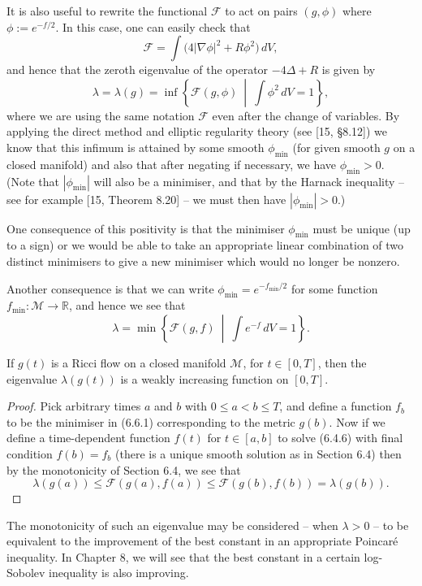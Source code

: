 It is also useful to rewrite the functional $\mathcal{F}$ to act on pairs $(g,\phi)$ where
$\phi := e^{-f/2}$. In this case, one can easily check that
\[
\mathcal{F} = \int \bigl(4|\nabla\phi|^2 + R\phi^2\bigr)\,dV,
\]
and hence that the zeroth eigenvalue of the operator $-4\Delta + R$ is given by
\[
\lambda = \lambda(g) = \inf\left\{\mathcal{F}(g,\phi)\ \middle|\ \int \phi^2\,dV = 1\right\},
\]
where we are using the same notation $\mathcal{F}$ even after the change of variables.
By applying the direct method and elliptic regularity theory (see [15, §8.12])
we know that this infimum is attained by some smooth $\phi_{\min}$ (for given
smooth $g$ on a closed manifold) and also that after negating if necessary, we
have $\phi_{\min} > 0$. (Note that $|\phi_{\min}|$ will also be a minimiser, and that by the
Harnack inequality -- see for example [15, Theorem 8.20] -- we must then
have $|\phi_{\min}| > 0$.)

One consequence of this positivity is that the minimiser $\phi_{\min}$ must be unique
(up to a sign) or we would be able to take an appropriate linear combination
of two distinct minimisers to give a new minimiser which would no longer
be nonzero.

Another consequence is that we can write $\phi_{\min} = e^{-f_{\min}/2}$ for some function
$f_{\min} : \mathcal{M} \to \mathbb{R}$, and hence we see that
\begin{equation}
\lambda = \min\left\{\mathcal{F}(g,f)\ \middle|\ \int e^{-f}\,dV = 1\right\}.
\tag{6.6.1}
\end{equation}

\begin{theorem}
\label{topping-gradient-flow-z0-eigenvalue-monotone}
If $g(t)$ is a Ricci flow on a closed manifold $\mathcal{M}$, for $t \in [0,T]$, then the eigenvalue $\lambda(g(t))$ is a weakly increasing function on $[0,T]$.
\end{theorem}

\begin{proof}
Pick arbitrary times $a$ and $b$ with $0 \le a < b \le T$, and define a
function $f_b$ to be the minimiser in (6.6.1) corresponding to the metric $g(b)$.
Now if we define a time-dependent function $f(t)$ for $t \in [a,b]$ to solve (6.4.6)
with final condition $f(b) = f_b$ (there is a unique smooth solution as in
Section 6.4) then by the monotonicity of Section 6.4, we see that
\[
\lambda(g(a)) \le \mathcal{F}(g(a),f(a)) \le \mathcal{F}(g(b),f(b)) = \lambda(g(b)).
\]
\end{proof}

The monotonicity of such an eigenvalue may be considered -- when $\lambda > 0$ --
to be equivalent to the improvement of the best constant in an appropriate
Poincar\'e inequality. In Chapter 8, we will see that the best constant in a
certain log-Sobolev inequality is also improving.
